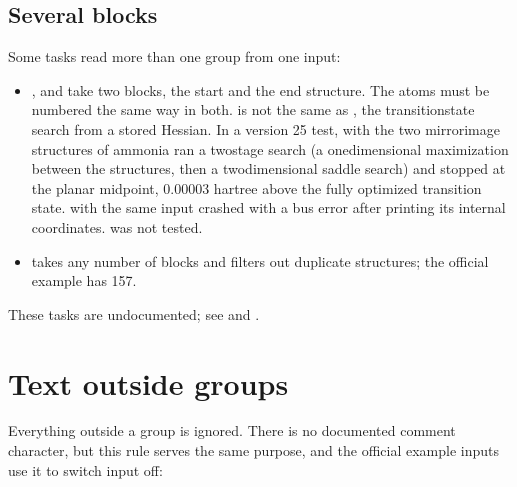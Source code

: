 \documentclass[letterpaper,10pt,english,openany,oneside]{sphinxmanual}
\begin{document}
\subsection{Several  blocks}
\label{\detokenize{start/input-syntax:several-molecule-blocks}}
\sphinxAtStartPar
Some tasks read more than one  group from one input:
\begin{itemize}
\item {} 
\sphinxAtStartPar
{},  and  take two blocks, the start and the end structure. The atoms must be
numbered the same way in both.  is not the same as {\hyperref[\detokenize{reference/optimize:optimize-saddle}]{}}, the
transition\sphinxhyphen{}state search from a stored Hessian. In a version 25 test,  with the two mirror\sphinxhyphen{}image
structures of ammonia ran a two\sphinxhyphen{}stage search (a one\sphinxhyphen{}dimensional maximization between the structures, then a
two\sphinxhyphen{}dimensional saddle search) and stopped at the planar midpoint, 0.00003 hartree above the fully optimized
transition state.  with the same input crashed with a bus error after printing its internal
coordinates.  was not tested.

\item {} 
\sphinxAtStartPar
{} takes any number of blocks and filters out duplicate structures; the official example has 157.

\end{itemize}

\sphinxAtStartPar
These tasks are undocumented; see {\hyperref[\detokenize{reference/control:control-task}]{}} and {\hyperref[\detokenize{reference/uniq:group-uniq}]{}}.




\section{Text outside groups}
\label{\detokenize{start/input-syntax:text-outside-groups}}
\sphinxAtStartPar
Everything outside a  group is ignored. There is no documented comment character, but this rule serves
the same purpose, and the official example inputs use it to switch input off:
\end{document}
